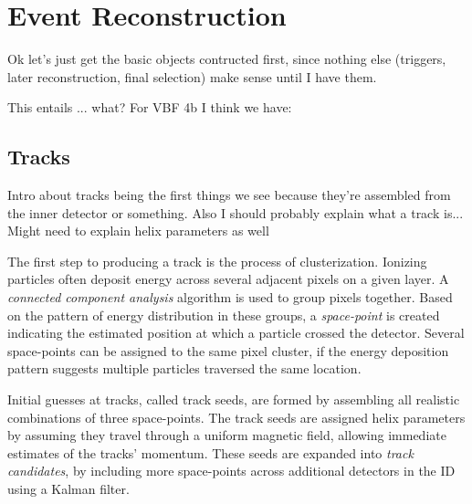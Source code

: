 \chapter{Event Reconstruction}

%


    Ok let's just get the basic objects contructed first, since nothing else (triggers, later reconstruction, final selection)
        make sense until I have them.

    This entails ... what? For VBF 4b I think we have:


    \section{Tracks}
        Intro about tracks being the first things we see because they're assembled from the inner detector or something.
        Also I should probably explain what a track is...
        Might need to explain helix parameters as well

        The first step to producing a track is the process of clusterization.
        Ionizing particles often deposit energy across several adjacent pixels on a given layer.
        A \textit{connected component analysis} algorithm is used to group pixels together. 
        Based on the pattern of energy distribution in these groups,
            a \textit{space-point} is created indicating the estimated position at which a particle crossed the detector.
        Several space-points can be assigned to the same pixel cluster,
            if the energy deposition pattern suggests multiple particles traversed the same location.

        Initial guesses at tracks, called track seeds, are formed by assembling all realistic combinations of three space-points.
        The track seeds are assigned helix parameters by assuming they travel through a uniform magnetic field,
            allowing immediate estimates of the tracks' momentum.
        These seeds are expanded into \textit{track candidates},
            by including more space-points across additional detectors in the ID using a Kalman filter.

